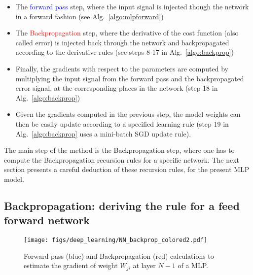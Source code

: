\begin{itemize}
\item The \textcolor{blue}{forward pass} step, where the input signal is injected though the network  in a forward fashion (see Alg.~\ref{algo:mlpforward})
\item The \textcolor{red}{Backpropagation} step, where the derivative of the cost function (also called error) is injected back through the network and backpropagated according to the derivative rules (see steps 8-17 in Alg.~\ref{algo:backprop})
\item Finally, the gradients with respect to the parameters are computed by multiplying the input signal from the forward pass and the backpropagated error signal, at the corresponding places in the network (step 18 in Alg.~\ref{algo:backprop})
\item Given the gradients computed in the previous step, the model weights can then be easily update according to a specified learning rule (step 19 in Alg.~\ref{algo:backprop} uses a mini-batch SGD update rule).
\end{itemize}

The main step of the method is the Backpropagation step, where one has to compute the Backpropagation recursion rules for a specific network.
The next section presents a careful deduction of these recursion rules, for the present MLP model.

\subsection{Backpropagation: deriving the rule for a feed forward network}

\begin{figure}[!h]
\centering
\texttt{[image: figs/deep\_learning/NN\_backprop\_colored2.pdf]}
\caption{Forward-pass (blue) and Backpropagation (red) calculations to estimate the gradient of weight $W_{ji}$ at layer $N-1$ of a MLP.}
\label{fig:NN_color}
\end{figure}

